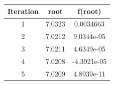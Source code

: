 \begin{center}
  \begin{tabular}{| c  c c |}
\hline
Iteration & root         & f(root) \\
\hline
1   &  7.0323         & 0.0034663 \\
\hline
2   &  7.0212          & 9.0344e-05 \\
\hline
3    & 7.0211         & 4.6349e-05 \\
\hline
4     & 7.0208        & -4.3921e-05  \\
\hline
5     & 7.0209        & 4.8939e-11  \\
\hline

\hline
\end{tabular}
\end{center}

